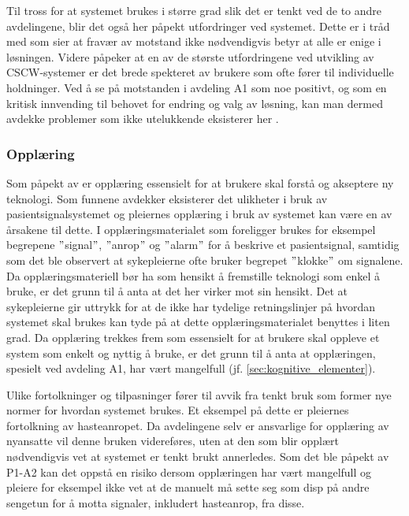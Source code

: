 \noindent
Til tross for at systemet brukes i større grad slik det er tenkt ved de to andre avdelingene, blir det også her påpekt utfordringer ved systemet. Dette er i tråd med \citet{Jacobsen12} som sier at fravær av motstand ikke nødvendigvis betyr at alle er enige i løsningen. Videre påpeker \citet{Berg99} at en av de største utfordringene ved utvikling av CSCW-systemer er det brede spekteret av brukere som ofte fører til individuelle holdninger. Ved å se på motstanden i avdeling A1 som noe positivt, og som en kritisk innvending til behovet for endring og valg av løsning, kan man dermed avdekke problemer som ikke utelukkende eksisterer her \citep{Jacobsen}. 

\subsubsection{Opplæring}	 
Som påpekt av \citet{Venkatesh99} er opplæring essensielt for at brukere skal forstå og akseptere ny teknologi.	Som funnene avdekker eksisterer det ulikheter i bruk av pasientsignalsystemet og pleiernes opplæring i bruk av systemet kan være en av årsakene til dette. I opplæringsmaterialet som foreligger brukes for eksempel begrepene $"$signal$"$, $"$anrop$"$ og $"$alarm$"$ for å beskrive et pasientsignal, samtidig som det ble observert at sykepleierne ofte bruker begrepet $"$klokke$"$ om signalene. Da opplæringsmateriell bør ha som hensikt å fremstille teknologi som enkel å bruke, er det grunn til å anta at det her virker mot sin hensikt. Det at sykepleierne gir uttrykk for at de ikke har tydelige retningslinjer på hvordan systemet skal brukes kan tyde på at dette opplæringsmaterialet benyttes i liten grad. Da opplæring trekkes frem som essensielt for at brukere skal oppleve et system som enkelt og nyttig å bruke, er det grunn til å anta at opplæringen, spesielt ved avdeling A1, har vært mangelfull (jf. \ref{sec:kognitive_elementer}). 

\noindent
Ulike fortolkninger og tilpasninger fører til avvik fra tenkt bruk som former nye normer for hvordan systemet brukes. Et eksempel på dette er pleiernes fortolkning av hasteanropet. Da avdelingene selv er ansvarlige for opplæring av nyansatte vil denne bruken videreføres, uten at den som blir opplært nødvendigvis vet at systemet er tenkt brukt annerledes. Som det ble påpekt av P1-A2 kan det oppstå en risiko dersom opplæringen har vært mangelfull og pleiere for eksempel ikke vet at de manuelt må sette seg som disp på andre sengetun for å motta signaler, inkludert hasteanrop, fra disse.

